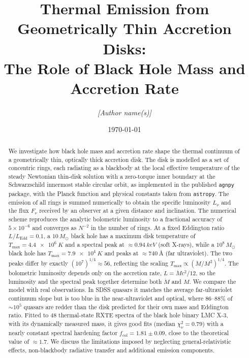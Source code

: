 \documentclass[11pt,a4paper]{article}
\title{\textbf{Thermal Emission from Geometrically Thin Accretion Disks:\\
The Role of Black Hole Mass and Accretion Rate}}
\author{\textit{[Author name(s)]}}
\date{\today}
\newcommand{\Msun}{M_\odot}
\newcommand{\Mdot}{\dot M}
\newcommand{\LEdd}{L_{\mathrm{Edd}}}
\newcommand{\Tmax}{T_{\max}}
\begin{document}
\maketitle

\begin{abstract}
\noindent
We investigate how black hole mass and accretion rate shape the thermal
continuum of a geometrically thin, optically thick accretion disk. The disk is
modelled as a set of concentric rings, each radiating as a blackbody at the
local effective temperature of the steady Newtonian thin-disk solution with a
zero-torque inner boundary at the Schwarzschild innermost stable circular
orbit, as implemented in the published \texttt{agnpy} package, with the
Planck function and physical constants taken from \texttt{astropy}. The
emission of all rings is summed numerically to obtain the
specific luminosity $L_\nu$ and the flux $F_\nu$ received by an observer at a
given distance and inclination. The numerical scheme reproduces the analytic
bolometric luminosity to a fractional accuracy of $5\times10^{-6}$ and
converges as $N^{-2}$ in the number of rings. At a fixed Eddington ratio
$L/\LEdd=0.1$, a $10\,\Msun$ black hole has a maximum disk temperature of
$\Tmax=\SI{4.4e6}{K}$ and a spectral peak at $\approx\SI{0.94}{keV}$ (soft
X-rays), while a $10^8\,\Msun$ black hole has $\Tmax=\SI{7.9e4}{K}$ and peaks
at $\approx\SI{740}{\angstrom}$ (far ultraviolet). The two peaks differ by
exactly $(10^7)^{1/4}\approx56$, reflecting the scaling
$\Tmax\propto(\Mdot/M^2)^{1/4}$. The bolometric luminosity depends only on the
accretion rate, $L=\Mdot c^2/12$, so the luminosity and the spectral peak
together determine both $\Mdot$ and $M$. We compare the model with real
observations. In SDSS quasars it matches the average far-ultraviolet
continuum slope but is too blue in the near-ultraviolet and optical, where
86--88\% of $\sim10^5$ quasars are redder than the disk predicted for their
own mass and Eddington ratio. Fitted to 48 thermal-state RXTE spectra of the
black hole binary LMC X-3, with its dynamically measured mass, it gives good
fits (median $\chi^2_\nu=0.79$) with a nearly constant spectral hardening
factor $f_{\mathrm{col}}=1.81\pm0.09$, close to the theoretical value of
$\approx1.7$. We discuss the limitations imposed by neglecting
general-relativistic effects, non-blackbody radiative transfer and additional
emission components.
\end{abstract}

\tableofcontents
\bigskip

\end{document}
